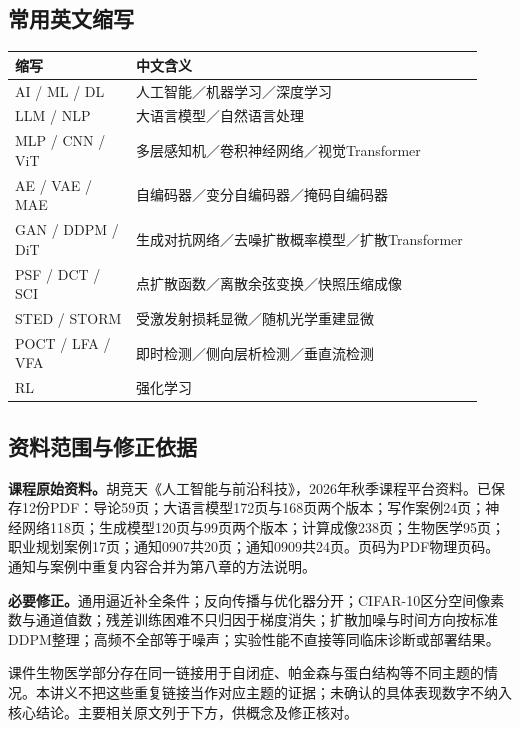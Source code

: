 \documentclass[UTF8,fontset=none,zihao=-4,a4paper]{ctexart}
\begin{document}
\subsection{常用英文缩写}
\begin{longtable}{>{\raggedright\arraybackslash}p{0.24\linewidth}>{\raggedright\arraybackslash}p{0.69\linewidth}}
\toprule 缩写 & 中文含义\\\midrule\endhead
AI / ML / DL & 人工智能／机器学习／深度学习\\
LLM / NLP & 大语言模型／自然语言处理\\
MLP / CNN / ViT & 多层感知机／卷积神经网络／视觉Transformer\\
AE / VAE / MAE & 自编码器／变分自编码器／掩码自编码器\\
GAN / DDPM / DiT & 生成对抗网络／去噪扩散概率模型／扩散Transformer\\
PSF / DCT / SCI & 点扩散函数／离散余弦变换／快照压缩成像\\
STED / STORM & 受激发射损耗显微／随机光学重建显微\\
POCT / LFA / VFA & 即时检测／侧向层析检测／垂直流检测\\
RL & 强化学习\\\bottomrule
\end{longtable}

\subsection{资料范围与修正依据}
\noindent\textbf{课程原始资料。}胡竞天《人工智能与前沿科技》，2026年秋季课程平台资料。已保存12份PDF：导论59页；大语言模型172页与168页两个版本；写作案例24页；神经网络118页；生成模型120页与99页两个版本；计算成像238页；生物医学95页；职业规划案例17页；通知0907共20页；通知0909共24页。页码为PDF物理页码。通知与案例中重复内容合并为第八章的方法说明。

\noindent\textbf{必要修正。}通用逼近补全条件；反向传播与优化器分开；CIFAR-10区分空间像素数与通道值数；残差训练困难不只归因于梯度消失；扩散加噪与时间方向按标准DDPM整理；高频不全部等于噪声；实验性能不直接等同临床诊断或部署结果。

课件生物医学部分存在同一链接用于自闭症、帕金森与蛋白结构等不同主题的情况。本讲义不把这些重复链接当作对应主题的证据；未确认的具体表现数字不纳入核心结论。主要相关原文列于下方，供概念及修正核对。
\end{document}
